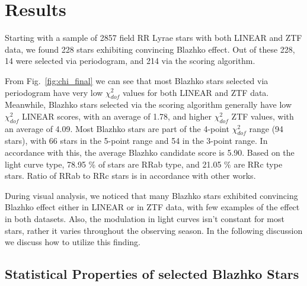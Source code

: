 

\section{Results}\label{sec:results}

Starting with a sample of 2857 field RR Lyrae stars with both LINEAR and ZTF data, we found 228 stars exhibiting
convincing Blazhko effect. Out of these 228, 14 were selected via periodogram, and 214 via the scoring algorithm. 

From Fig.~\ref{fig:chi_final} we can see that most Blazhko stars selected via periodogram have very low $\chi^2_{dof}$ values for both 
LINEAR and ZTF data. Meanwhile, Blazhko stars selected via the scoring algorithm generally have low $\chi^2_{dof}$ LINEAR scores, with an average of 1.78, and higher $\chi^2_{dof}$ ZTF values,
with an average of 4.09. Most Blazhko stars are part of the 4-point $\chi^2_{dof}$ range (94 stars), with 66 stars in the 5-point range and 54 in the 3-point range. In accordance with this, the
average Blazhko candidate score is 5.90. Based on the light curve type, 78.95 \% of stars are RRab type, and 21.05 \% are RRc type stars. Ratio of RRab to RRc stars is in accordance with other works.

During visual analysis, we noticed that many Blazhko stars exhibited convincing Blazhko effect either in LINEAR or in ZTF data, with few examples of the effect in both datasets. 
Also, the modulation in light curves isn't constant for most stars, rather it varies throughout the observing season. In the following discussion we discuss how to utilize this finding.


\subsection{Statistical Properties of selected Blazhko Stars}

